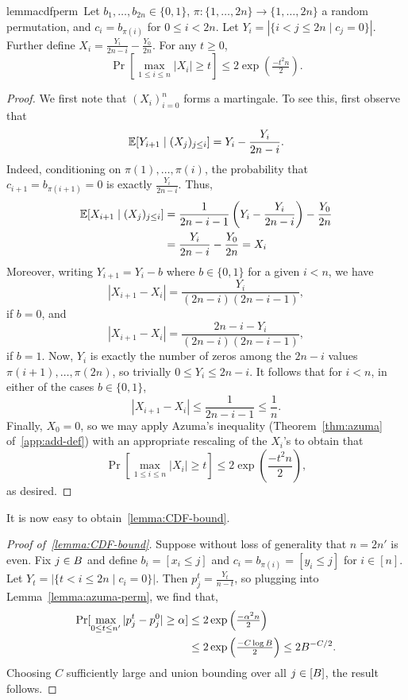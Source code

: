 \begin{restatable}[]{lemma}{cdfperm}\label{lemma:azuma-perm}\
Let $b_1,\dots,b_{2n}\in \{0,1\}$, $\pi: \{1,\dots,2n\}\to \{1,\dots,2n\}$ a random permutation, and $c_i=b_{\pi(i)}$ for $0\leq i < 2n$. Let $Y_i=|\{i< j\leq 2n \mid c_j=0\}|$. Further define $X_i=\frac{Y_i}{2n-i}-\frac{Y_0}{2n}$. For any $t\geq 0$,
\[
\Pr\left[\max_{1\leq i \leq n} |X_i|\geq t\right]\leq 2\exp\left(\tfrac{-t^2n}{2} \right).
\]
\end{restatable}
\begin{proof}
We first note that $(X_i)_{i=0}^n$ forms a martingale. To see this, first observe that
\[
\mathbb{E}[Y_{i+1}\mid (X_j)_{j\leq i}]=Y_i-\frac{Y_i}{2n-i}.
\]
Indeed, conditioning on $\pi(1),\dots, \pi(i)$, the probability that $c_{i+1}=b_{\pi(i+1)}=0$ is exactly $\frac{Y_i}{2n-i}$. Thus, 
\begin{align*}
\mathbb{E}[X_{i+1}\mid (X_j)_{j\leq i}]&=\frac{1}{2n-i-1}\left(Y_i-\frac{Y_i}{2n-i}\right)-\frac{Y_0}{2n}\\
&=\frac{Y_i}{2n-i}-\frac{Y_0}{2n}=X_i
\end{align*}
Moreover, writing $Y_{i+1}=Y_i-b$ where $b\in \{0,1\}$ for a given $i< n$, we have
\[
|X_{i+1}-X_i|
=\frac{Y_i}{(2n-i)(2n-i-1)},
\]
if $b=0$, and 
\[
|X_{i+1}-X_i|=\frac{2n-i-Y_i}{(2n-i)(2n-i-1)},
\]
if $b=1$. Now, $Y_i$ is exactly the number of zeros among the $2n-i$ values $\pi(i+1),\dots,\pi(2n)$, so trivially $0\leq Y_i\leq 2n-i$. It follows that for $i<n$, in either of the cases $b\in\{0,1\}$,
\[
|X_{i+1}-X_i|\leq\frac{1}{2n-i-1}\leq\frac{1}{n}.
\]
Finally, $X_0=0$, so we may apply Azuma's inequality (Theorem~\ref{thm:azuma} of~\cref{app:add-def}) with an appropriate rescaling of the $X_i$'s to obtain that
\[
\Pr\left[\max_{1\leq i \leq n} |X_i|\geq t\right]\leq 2\exp\left(\frac{-t^2n}{2} \right),
\]
as desired.
\end{proof}
It is now easy to obtain~\cref{lemma:CDF-bound}.
\begin{proof}[Proof of~\cref{lemma:CDF-bound}]
Suppose without loss of generality that $n=2n'$ is even. Fix $j\in B$ and define $b_i=[x_i\leq j]$ and $c_i=b_{\pi(i)}=[y_i\leq j]$ for $i\in [n]$. Let $Y_t=|\{t< i\leq 2n \mid c_i=0\}|$. Then $p_j^t=\frac{Y_t}{n-t}$, so plugging into Lemma~\ref{lemma:azuma-perm}, we find that,
\begin{align*}
\textnormal{Pr}[\max_{0\leq t\leq n'}|p^{t}_j-p^{0}_j|\geq \alpha]&\leq 2\exp\left( \tfrac{-\alpha^2n}{2}\right)\\&\leq 2\exp\left(\tfrac{-C\log B}{2}\right)\leq 2B^{-C/2}.
\end{align*}
Choosing $C$ sufficiently large and union bounding over all $j \in [B]$, the result follows.
\end{proof}

